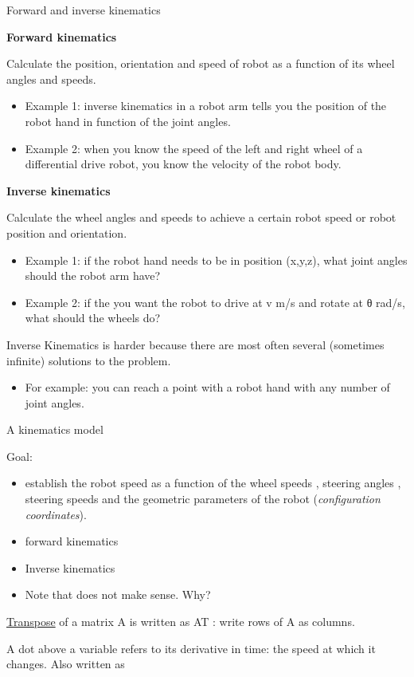 \documentclass[compress]{beamer}
\begin{document}
\begin{frame}{Forward and inverse kinematics}

\textbf{Forward kinematics}

Calculate the position, orientation and speed of robot as a function of
its wheel angles and speeds.

\begin{itemize}
    \item Example 1: inverse kinematics in a robot arm tells you the position of
  the robot hand in function of the joint angles.
    \item Example 2: when you know the speed of the left and right wheel of a
  differential drive robot, you know the velocity of the robot body.
\end{itemize}

\textbf{Inverse kinematics}

Calculate the wheel angles and speeds to achieve a certain robot speed
or robot position and orientation.

\begin{itemize}
    \item Example 1: if the robot hand needs to be in position (x,y,z), what
  joint angles should the robot arm have?
    \item Example 2: if the you want the robot to drive at v m/s and rotate at θ
  rad/s, what should the wheels do?
\end{itemize}

Inverse Kinematics is harder because there are most often several
(sometimes infinite) solutions to the problem.

\begin{itemize}
    \item For example: you can reach a point with a robot hand with any number
  of joint angles.
\end{itemize}

\end{frame}

\begin{frame}{A kinematics model}

Goal:

\begin{itemize}
    \item establish the robot speed as a function of the wheel speeds , steering
  angles , steering speeds and the geometric parameters of the robot
  (\emph{configuration coordinates}).
    \item forward kinematics
    \item Inverse kinematics
    \item Note that does not make sense. Why?
\end{itemize}

\href{http://en.wikipedia.org/wiki/Transpose}{Transpose} of a matrix A
is written as AT : write rows of A as columns.

A dot above a variable refers to its derivative in time: the speed at
which it changes. Also written as

\end{frame}
\end{document}
